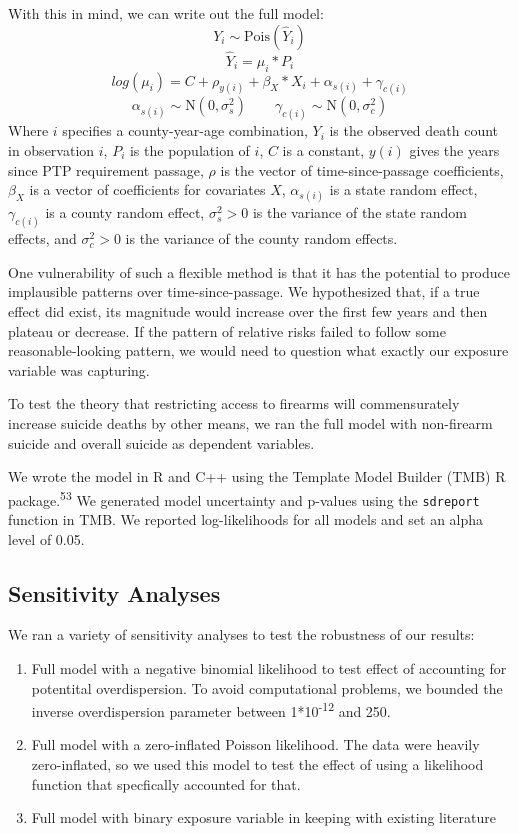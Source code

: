 \documentclass[]{article}
\providecommand{\tightlist}{%
  \setlength{\itemsep}{0pt}\setlength{\parskip}{0pt}}
\begin{document}
With this in mind, we can write out the full model: \[
Y_i \sim \text{Pois}(\hat{Y}_i)
\] \[
\hat{Y}_i = \mu_i * P_i
\] \[
log(\mu_i)= C + \rho_{y(i)}+ \beta_X*X_i +\alpha_{s(i)}+\gamma_{c(i)}
\] \[
\alpha_{s(i)} \sim \text{N}(0, \sigma^2_s) 
\qquad
\gamma_{c(i)} \sim \text{N}(0, \sigma^2_c)
\] Where \(i\) specifies a county-year-age combination, \(Y_i\) is the
observed death count in observation \(i\), \(P_i\) is the population of
\(i\), \(C\) is a constant, \(y(i)\) gives the years since PTP
requirement passage, \(\rho\) is the vector of time-since-passage
coefficients, \(\beta_X\) is a vector of coefficients for covariates
\(X\), \(\alpha_{s(i)}\) is a state random effect, \(\gamma_{c(i)}\) is
a county random effect, \(\sigma^2_s > 0\) is the variance of the state
random effects, and \(\sigma^2_c > 0\) is the variance of the county
random effects.

One vulnerability of such a flexible method is that it has the potential
to produce implausible patterns over time-since-passage. We hypothesized
that, if a true effect did exist, its magnitude would increase over the
first few years and then plateau or decrease. If the pattern of relative
risks failed to follow some reasonable-looking pattern, we would need to
question what exactly our exposure variable was capturing.

To test the theory that restricting access to firearms will
commensurately increase suicide deaths by other means, we ran the full
model with non-firearm suicide and overall suicide as dependent
variables.

We wrote the model in R and C++ using the Template Model Builder (TMB) R
package.\textsuperscript{53} We generated model uncertainty and p-values
using the \texttt{sdreport} function in TMB. We reported log-likelihoods
for all models and set an alpha level of 0.05.

\subsection{Sensitivity Analyses}\label{sensitivity-analyses}

We ran a variety of sensitivity analyses to test the robustness of our
results:

\begin{enumerate}
\def\labelenumi{\arabic{enumi}.}
\tightlist
\item
  Full model with a negative binomial likelihood to test effect of
  accounting for potentital overdispersion. To avoid computational
  problems, we bounded the inverse overdispersion parameter between
  1*10\textsuperscript{-12} and 250.
\item
  Full model with a zero-inflated Poisson likelihood. The data were
  heavily zero-inflated, so we used this model to test the effect of
  using a likelihood function that specfically accounted for that.\\
\item
  Full model with binary exposure variable in keeping with existing
  literature
\end{enumerate}
\end{document}
